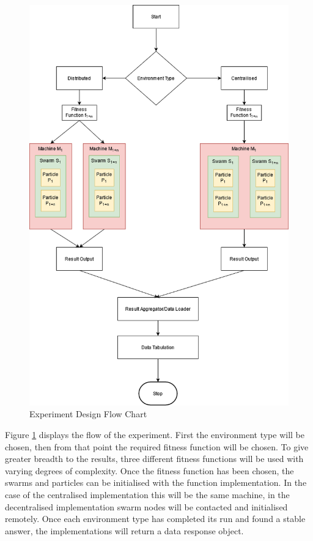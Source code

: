\documentclass[oneside,12pt]{book}
\begin{document}
\begin{figure}[H]
    \centering
    \includegraphics[scale=0.6]{Images/ExperimentFlow.png}
    \caption{Experiment Design Flow Chart}
    \label{fig:Experiment Design Flow Chart}
\end{figure}

Figure \ref{fig:Experiment Design Flow Chart} displays the flow of the experiment. First the environment type will be chosen, then from that point the required fitness function will be chosen. To give greater breadth to the results, three different fitness functions will be used with varying degrees of complexity. Once the fitness function has been chosen, the swarms and particles can be initialised with the function implementation. In the case of the centralised implementation this will be the same machine, in the decentralised implementation swarm nodes will be contacted and initialised remotely. Once each environment type has completed its run and found a stable answer, the implementations will return a data response object. 
\end{document}
